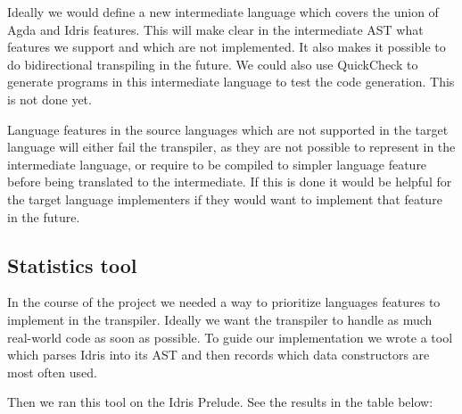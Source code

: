 \documentclass[parskip=half]{scrartcl}
\begin{document}

Ideally we would define a new intermediate language which covers the union of
Agda and Idris features.  This will make clear in the intermediate AST what
features we support and which are not implemented. It also makes it possible to
do bidirectional transpiling in the future.  We could also use QuickCheck to
generate programs in this intermediate language to test the code generation.
This is not done yet.

Language features in the source languages which are not supported in the target
language will either fail the transpiler, as they are not possible to represent
in the intermediate language, or require to be compiled to simpler
language feature before being translated to the intermediate. If this is
done it would be helpful for the target language implementers if they would
want to implement that feature in the future.


\subsection{Statistics tool}
In the course of the project we needed a way to prioritize languages features
to implement in the transpiler. Ideally we want the transpiler to handle
as much real-world code as soon as possible. To guide our implementation we
wrote a tool which parses Idris into its AST and then records which data
constructors are most often used.

Then we ran this tool on the Idris Prelude. See the results in the table below:
\end{document}

